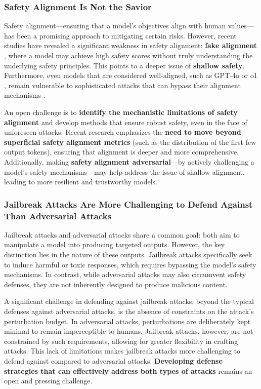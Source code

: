 \subsubsection{Safety Alignment Is Not the Savior}

Safety alignment—ensuring that a model's objectives align with human values—has been a promising approach to mitigating certain risks. However, recent studies have revealed a significant weakness in safety alignment: \textbf{fake alignment} \cite{wang2024fake,greenblatt2024alignment}, where a model may achieve high safety scores without truly understanding the underlying safety principles. This points to a deeper issue of \textbf{shallow safety}. Furthermore, even models that are considered well-aligned, such as GPT-4o \cite{gpt-4o} or o1 \cite{openai-o1}, remain vulnerable to sophisticated attacks that can bypass their alignment mechanisms \cite{ying2024unveiling}.

An open challenge is to \textbf{identify the mechanistic limitations of safety alignment} and develop methods that ensure robust safety, even in the face of unforeseen attacks. Recent research \cite{qi2024safety} emphasizes the \textbf{need to move beyond superficial safety alignment metrics} (such as the distribution of the first few output tokens), ensuring that alignment is deeper and more comprehensive.
Additionally, making \textbf{safety alignment adversarial}—by actively challenging a model’s safety mechanisms—may help address the issue of shallow alignment, leading to more resilient and trustworthy models.


\subsubsection{Jailbreak Attacks Are More Challenging to Defend Against Than Adversarial Attacks}
Jailbreak attacks and adversarial attacks share a common goal: both aim to manipulate a model into producing targeted outputs. However, the key distinction lies in the nature of these outputs. Jailbreak attacks specifically seek to induce harmful or toxic responses, which requires bypassing the model's safety mechanisms. In contrast, while adversarial attacks may also circumvent safety defenses, they are not inherently designed to produce malicious content.

A significant challenge in defending against jailbreak attacks, beyond the typical defenses against adversarial attacks, is the absence of constraints on the attack's perturbation budget. In adversarial attacks, perturbations are deliberately kept minimal to remain imperceptible to humans. Jailbreak attacks, however, are not constrained by such requirements, allowing for greater flexibility in crafting attacks. This lack of limitations makes jailbreak attacks more challenging to defend against compared to adversarial attacks. \textbf{Developing defense strategies that can effectively address both types of attacks} remains an open and pressing challenge.


